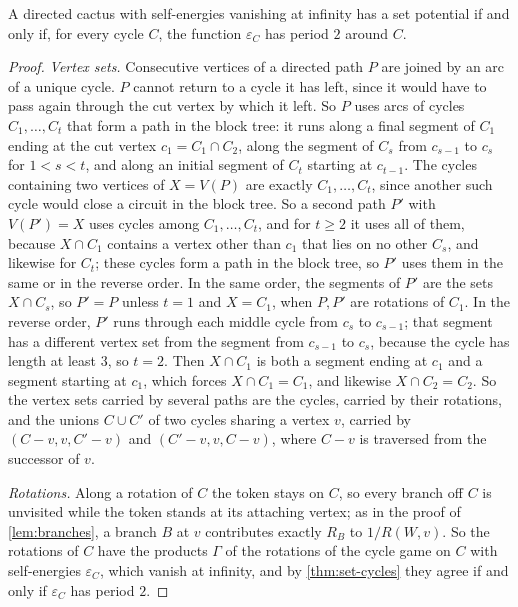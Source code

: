 \documentclass[final]{siamart0516}
\numberwithin{theorem}{section}
\numberwithin{equation}{section}
\theoremstyle{siamnonum}
\theoremstyle{plain}
\begin{document}
\begin{theorem}\label{thm:cacti}
A directed cactus with self-energies vanishing at infinity has a set potential if and only if, for every cycle $C$, the function $\varepsilon_C$ has period $2$ around $C$.
\end{theorem}
\begin{proof}
\emph{Vertex sets.} Consecutive vertices of a directed path $P$ are joined by an arc of a unique cycle. $P$ cannot return to a cycle it has left, since it would have to pass again through the cut vertex by which it left. So $P$ uses arcs of cycles $C_1,\dots,C_t$ that form a path in the block tree: it runs along a final segment of $C_1$ ending at the cut vertex $c_1=C_1\cap C_2$, along the segment of $C_s$ from $c_{s-1}$ to $c_s$ for $1<s<t$, and along an initial segment of $C_t$ starting at $c_{t-1}$. The cycles containing two vertices of $X=V(P)$ are exactly $C_1,\dots,C_t$, since another such cycle would close a circuit in the block tree. So a second path $P'$ with $V(P')=X$ uses cycles among $C_1,\dots,C_t$, and for $t\ge2$ it uses all of them, because $X\cap C_1$ contains a vertex other than $c_1$ that lies on no other $C_s$, and likewise for $C_t$; these cycles form a path in the block tree, so $P'$ uses them in the same or in the reverse order. In the same order, the segments of $P'$ are the sets $X\cap C_s$, so $P'=P$ unless $t=1$ and $X=C_1$, when $P,P'$ are rotations of $C_1$. In the reverse order, $P'$ runs through each middle cycle from $c_s$ to $c_{s-1}$; that segment has a different vertex set from the segment from $c_{s-1}$ to $c_s$, because the cycle has length at least $3$, so $t=2$. Then $X\cap C_1$ is both a segment ending at $c_1$ and a segment starting at $c_1$, which forces $X\cap C_1=C_1$, and likewise $X\cap C_2=C_2$. So the vertex sets carried by several paths are the cycles, carried by their rotations, and the unions $C\cup C'$ of two cycles sharing a vertex $v$, carried by $(C-v,v,C'-v)$ and $(C'-v,v,C-v)$, where $C-v$ is traversed from the successor of $v$.

\emph{Rotations.} Along a rotation of $C$ the token stays on $C$, so every branch off $C$ is unvisited while the token stands at its attaching vertex; as in the proof of \cref{lem:branches}, a branch $B$ at $v$ contributes exactly $R_B$ to $1/R(W,v)$. So the rotations of $C$ have the products $\Gamma$ of the rotations of the cycle game on $C$ with self-energies $\varepsilon_C$, which vanish at infinity, and by \cref{thm:set-cycles} they agree if and only if $\varepsilon_C$ has period $2$.


\end{proof}
\end{document}
